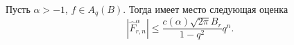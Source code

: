 
\begin{lemma} Пусть $\alpha>-1$, $f\in A_q(B)$. Тогда имеет место следующая оценка
 \begin{equation}\label{sobleg-5.44}
|\hat F^\alpha_{r,n}|\le \frac{c(\alpha)\sqrt{2\pi}B_r}{1-q^2}q^n.
 \end{equation}
\end{lemma}


